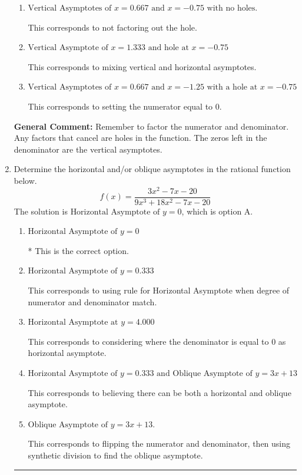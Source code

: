 \documentclass{extbook}[14pt]
\newcommand{\litem}[1]{\item #1

\rule{\textwidth}{0.4pt}}
\begin{document}
\begin{enumerate}
{\begin{enumerate}[label=\Alph*.]
This corresponds to considering where the denominator is equal to 0 as holes.
\item \( \text{Vertical Asymptotes of } x = 0.667 \text{ and } x = -0.75 \text{ with no holes.} \)

This corresponds to not factoring out the hole.
\item \( \text{Vertical Asymptote of } x = 1.333 \text{ and hole at } x = -0.75 \)

This corresponds to mixing vertical and horizontal asymptotes.
\item \( \text{Vertical Asymptotes of } x = 0.667 \text{ and } x = -1.25 \text{ with a hole at } x = -0.75 \)

This corresponds to setting the numerator equal to 0.
\end{enumerate}

\textbf{General Comment:} Remember to factor the numerator and denominator. Any factors that cancel are holes in the function. The zeros left in the denominator are the vertical asymptotes.
}
\litem{
Determine the horizontal and/or oblique asymptotes in the rational function below.
\[ f(x) = \frac{3x^{2} -7 x -20}{9x^{3} +18 x^{2} -7 x -20} \]The solution is \( \text{Horizontal Asymptote of } y = 0 \), which is option A.\begin{enumerate}[label=\Alph*.]
\item \( \text{Horizontal Asymptote of } y = 0 \)

* This is the correct option.
\item \( \text{Horizontal Asymptote of } y = 0.333  \)

This corresponds to using rule for Horizontal Asymptote when degree of numerator and denominator match.
\item \( \text{Horizontal Asymptote at } y = 4.000 \)

This corresponds to considering where the denominator is equal to 0 as horizontal asymptote.
\item \( \text{Horizontal Asymptote of } y = 0.333 \text{ and Oblique Asymptote of } y = 3x + 13 \)

This corresponds to believing there can be both a horizontal and oblique asymptote.
\item \( \text{Oblique Asymptote of } y = 3x + 13. \)

This corresponds to flipping the numerator and denominator, then using synthetic division to find the oblique asymptote.
\end{enumerate}

}
\end{enumerate}
\end{document}
